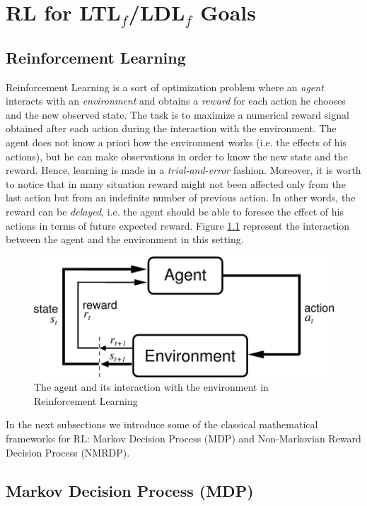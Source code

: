 \chapter{RL for {\sc LTL}$_f$/{\sc LDL}$_f$ Goals}
\label{ch:rl}
\section{Reinforcement Learning}
\label{RL}
Reinforcement Learning \citep{Sutton:1998:IRL:551283} is a sort of optimization problem where an \emph{agent} interacts with an \emph{environment} and obtains a \emph{reward} for each action he chooses and the new observed state. The task is to maximize a numerical reward signal obtained after each action during the interaction with the environment. The agent does not know a priori how the environment works (i.e. the effects of his actions), but he can make observations in order to know the new state and the reward. Hence, learning is made in a \emph{trial-and-error} fashion. Moreover, it is worth to notice that in many situation reward might not been affected only from the last action but from an indefinite number of previous action. In other words, the reward can be \emph{delayed}, i.e. the agent should be able to foresee the effect of his actions in terms of future expected reward. Figure \ref{fig:agent-environment} represent the interaction between the agent and the environment in this setting.
\begin{figure}[!h]
	\centering
	\includegraphics[width=.8\linewidth]{images/agent-environment}
	\caption{The agent and its interaction with the environment in Reinforcement Learning}\label{fig:agent-environment}
\end{figure}

In the next subsections we introduce some of the classical mathematical frameworks for RL: Markov Decision Process (MDP) and Non-Markovian Reward Decision Process (NMRDP).
\section{Markov Decision Process (MDP)}
\label{MDP}

